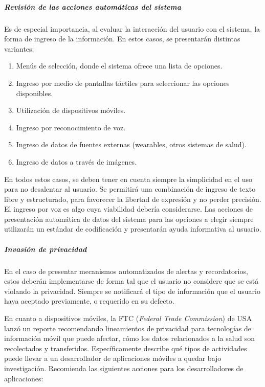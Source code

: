     
\subparagraph{Revisión de las acciones automáticas del sistema}

    Es de especial importancia, al evaluar la interacción del usuario con el sistema, la forma de ingreso de la información.
    En estos casos, se presentarán distintas variantes:
    \begin{enumerate}
		\item Menús de selección, donde el sistema ofrece una lista de opciones.
        \item Ingreso por medio de pantallas táctiles para seleccionar las opciones disponibles.
        \item Utilización de dispositivos móviles.
        \item Ingreso por reconocimiento de voz.
        \item Ingreso de datos de fuentes externas (wearables, otros sistemas de salud).
        \item Ingreso de datos a través de imágenes.
	\end{enumerate}
    
	En todos estos casos, se deben tener en cuenta siempre la simplicidad en el uso para no desalentar al usuario.
    Se permitirá una combinación de ingreso de texto libre y estructurado, para favorecer la libertad de expresión y no perder precisión.
    El ingreso por voz es algo cuya viabilidad debería considerarse.
    Las acciones de presentación automática de datos del sistema para las opciones a elegir siempre utilizarán un estándar de codificación y presentarán ayuda informativa al usuario. 


\subparagraph{Invasión de privacidad}

    En el caso de presentar mecanismos automatizados de alertas y recordatorios, estos deberán implementarse de forma tal que el usuario no considere que se está violando la privacidad.
    Siempre se notificará el tipo de información que el usuario haya aceptado previamente, o requerido en su defecto.
    
   	En cuanto a dispositivos móviles, la FTC (\textit{Federal Trade Commission}) de USA lanzó un reporte recomendando lineamientos de privacidad para tecnologías de información móvil que puede afectar, cómo los datos relacionados a la salud son recolectados y transferidos.
    Específicamente describe qué tipos de actividades puede llevar a un desarrollador de aplicaciones móviles a quedar bajo investigación.
    Recomienda las siguientes acciones para los desarrolladores de aplicaciones:
    
